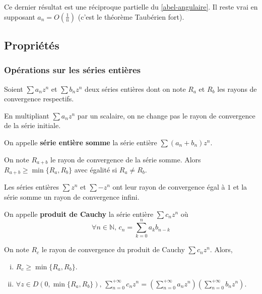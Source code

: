 	\begin{remark}
		Ce dernier résultat est une réciproque partielle du \cref{abel-angulaire}. Il reste vrai en supposant $a_n = O \left( \frac{1}{n} \right)$ (c'est le théorème Taubérien fort).
	\end{remark}
	
	\subsection{Propriétés}
	
	\subsubsection{Opérations sur les séries entières}
	
	
	Soient $\sum a_n z^n$ et $\sum b_n z^n$ deux séries entières dont on note $R_a$ et $R_b$ les rayons de convergence respectifs.
	
	\begin{proposition}
		En multipliant $\sum a_n z^n$ par un scalaire, on ne change pas le rayon de convergence de la série initiale.
	\end{proposition}
	
	\begin{definition}
		On appelle \textbf{série entière somme} la série entière $\sum (a_n + b_n) z^n$.
	\end{definition}
	
	\begin{proposition}
		On note $R_{a+b}$ le rayon de convergence de la série somme. Alors $R_{a+b} \geq \min \{R_a, R_b\}$ avec égalité si $R_a \neq R_b$.
	\end{proposition}
	
	
	\begin{example}
		Les séries entières $\sum z^n$ et $\sum -z^n$ ont leur rayon de convergence égal à $1$ et la série somme un rayon de convergence infini.
	\end{example}
	
	
	\begin{definition}
		On appelle \textbf{produit de Cauchy} la série entière $\sum c_n z^n$ où
		\[ \forall n \in \mathbb{N}, \, c_n = \sum_{k=0}^n a_k b_{n-k} \]
	\end{definition}
	
	\begin{proposition}
		On note $R_{c}$ le rayon de convergence du produit de Cauchy $\sum c_n z^n$. Alors,
		\begin{enumerate}[(i)]
			\item $R_c \geq \min \{R_a, R_b\}$.
			\item $\forall z \in D(0, \min \{R_a, R_b\}), \, \sum_{n = 0}^{+\infty} c_n z^n = (\sum_{n = 0}^{+\infty} a_n z^n) (\sum_{n = 0}^{+\infty} b_n z^n)$.
		\end{enumerate}
	\end{proposition}
	
